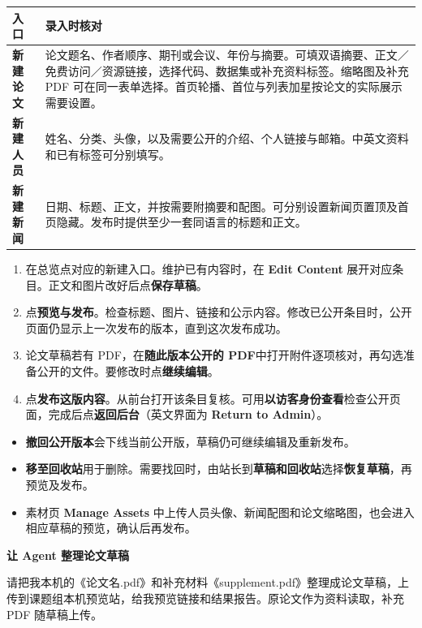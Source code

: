 \documentclass[UTF8,a4paper,zihao=-4,fontset=none]{ctexart}
\newcommand{\key}[1]{\textsf{\textbf{#1}}}
\newcommand{\topic}[1]{\par\vspace{9pt}{\large\sffamily\bfseries\color{navy}#1}\par\vspace{1pt}}
\newcommand{\pagetopic}[1]{{\LARGE\sffamily\bfseries\color{navy}#1}\par\vspace{5pt}}
\newcommand{\notice}[1]{%
  \par\smallskip
  {\setlength{\fboxsep}{9pt}\noindent\colorbox{panel}{%
    \parbox{\dimexpr\linewidth-2\fboxsep\relax}{#1}}}\par\smallskip}
\begin{document}
\begin{tabularx}{\linewidth}{@{}p{25mm}Y@{}}
\toprule
\key{入口} & \key{录入时核对} \\
\midrule
\key{新建论文} & 论文题名、作者顺序、期刊或会议、年份与摘要。可填双语摘要、正文／免费访问／资源链接，选择代码、数据集或补充资料标签。缩略图及补充 PDF 可在同一表单选择。首页轮播、首位与列表加星按论文的实际展示需要设置。 \\
\key{新建人员} & 姓名、分类、头像，以及需要公开的介绍、个人链接与邮箱。中英文资料和已有标签可分别填写。 \\
\key{新建新闻} & 日期、标题、正文，并按需要附摘要和配图。可分别设置新闻页置顶及首页隐藏。发布时提供至少一套同语言的标题和正文。 \\
\bottomrule
\end{tabularx}

\topic{从保存到发布}

\begin{enumerate}
  \item 在总览点对应的新建入口。维护已有内容时，在 \key{Edit Content} 展开对应条目。正文和图片改好后点\key{保存草稿}。
  \item 点\key{预览与发布}。检查标题、图片、链接和公示内容。修改已公开条目时，公开页面仍显示上一次发布的版本，直到这次发布成功。
  \item 论文草稿若有 PDF，在\key{随此版本公开的 PDF}中打开附件逐项核对，再勾选准备公开的文件。要修改时点\key{继续编辑}。
  \item 点\key{发布这版内容}。从前台打开该条目复核。可用\key{以访客身份查看}检查公开页面，完成后点\key{返回后台}（英文界面为 \key{Return to Admin}）。
\end{enumerate}

\topic{撤回、删除与恢复}

\begin{itemize}
  \item \key{撤回公开版本}会下线当前公开版，草稿仍可继续编辑及重新发布。
  \item \key{移至回收站}用于删除。需要找回时，由站长到\key{草稿和回收站}选择\key{恢复草稿}，再预览及发布。
  \item 素材页 \key{Manage Assets} 中上传人员头像、新闻配图和论文缩略图，也会进入相应草稿的预览，确认后再发布。
\end{itemize}

\newpage
\pagetopic{让 Agent 整理论文草稿}

\notice{请把我本机的《论文名.pdf》和补充材料《supplement.pdf》整理成论文草稿，上传到课题组本机预览站，给我预览链接和结果报告。原论文作为资料读取，补充 PDF 随草稿上传。}
\end{document}
